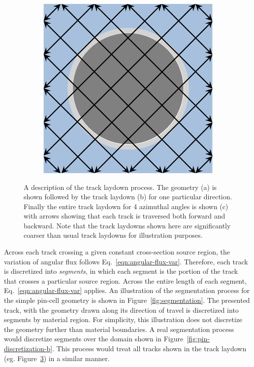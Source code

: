 \begin{figure}[h!]
\begin{subfigure}{0.3\textwidth}
		\caption{}
		\label{fig:track-laydown-b}
	\end{subfigure}
	\begin{subfigure}{0.3\textwidth}
		\centering
		\includegraphics[width=\linewidth]{figures/pin_3.PNG}
		\caption{}
		\label{fig:track-laydown-c}
	\end{subfigure}
	\caption[]{A description of the track laydown process. The geometry (a) is shown followed by the track laydown (b) for one particular direction. Finally the entire track laydown for 4 azimuthal angles is shown (c) with arrows showing that each track is traversed both forward and backward. Note that the track laydowns shown here are significantly coarser than usual track laydowns for illustration purposes.}
	\label{fig:track-laydown}
\end{figure}

Across each track crossing a given constant cross-section source region, the variation of angular flux follows Eq.~\ref{eqn:angular-flux-var}. Therefore, each track is discretized into \textit{segments}, in which each segment is the portion of the track that crosses a particular source region. Across the entire length of each segment, Eq.~\ref{eqn:angular-flux-var} applies. An illustration of the segmentation process for the simple pin-cell geometry is shown in Figure~\ref{fig:segmentation}. The presented track, with the geometry drawn along its direction of travel is discretized into segments by material region. For simplicity, this illustration does not discretize the geometry further than material boundaries. A real segmentation process would discretize segments over the domain shown in Figure~\ref{fig:pin-discretization-b}. This process would treat all tracks shown in the track laydown (eg. Figure~\ref{fig:track-laydown}) in a similar manner.


